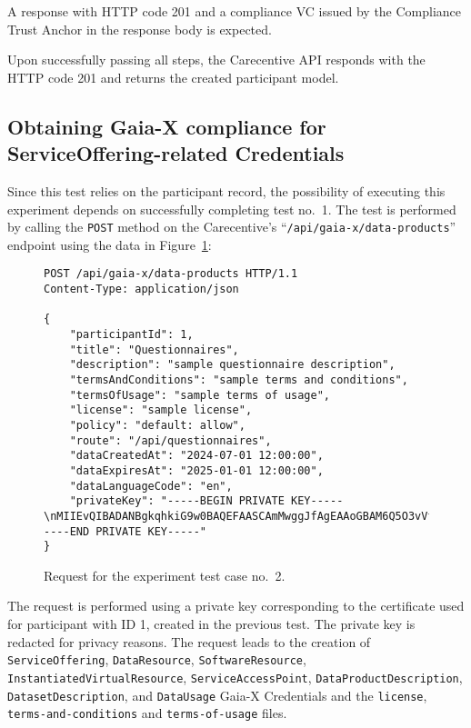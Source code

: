 A response with HTTP code 201 and a compliance VC issued by the Compliance Trust Anchor in the response body is expected.

Upon successfully passing all steps, the Carecentive API responds with the HTTP code 201 and returns the created participant model.

\subsection[Service Offering Compliance]{Obtaining Gaia-X compliance for ServiceOffering-related Credentials}\label{subsec:service-offering-compliance}

Since this test relies on the participant record, the possibility of executing this experiment depends on successfully completing test no.~1.
The test is performed by calling the \texttt{POST} method on the Carecentive's ``\texttt{/api\-/gaia-x\-/data-products}'' endpoint using the data in Figure~\ref{fig:test_case_2}:

\begin{figure}[h]
    \centering
    \begin{verbatim}
POST /api/gaia-x/data-products HTTP/1.1
Content-Type: application/json

{
    "participantId": 1,
	"title": "Questionnaires",
	"description": "sample questionnaire description",
	"termsAndConditions": "sample terms and conditions",
	"termsOfUsage": "sample terms of usage",
	"license": "sample license",
	"policy": "default: allow",
	"route": "/api/questionnaires",
	"dataCreatedAt": "2024-07-01 12:00:00",
	"dataExpiresAt": "2025-01-01 12:00:00",
	"dataLanguageCode": "en",
	"privateKey": "-----BEGIN PRIVATE KEY-----\nMIIEvQIBADANBgkqhkiG9w0BAQEFAASCAmMwggJfAgEAAoGBAM6Q5O3vVfnxk6P7\n...\nYWw+HiFJh9XQpRUtv9PV8L8AqFFfMdsOpT6pgC+aA/WB\n-----END PRIVATE KEY-----"
}
    \end{verbatim}
    \caption{Request for the experiment test case no.~2.}\label{fig:test_case_2}
\end{figure}

The request is performed using a private key corresponding to the certificate used for participant with ID 1, created in the previous test.
The private key is redacted for privacy reasons.
The request leads to the creation of \texttt{ServiceOffering}, \texttt{DataResource}, \texttt{SoftwareResource}, \texttt{InstantiatedVirtualResource}, \texttt{ServiceAccessPoint}, \texttt{DataProductDescription}, \texttt{DatasetDescription}, and \texttt{DataUsage} Gaia-X Credentials and the \texttt{license}, \texttt{terms-and-conditions} and \texttt{terms-of-usage} files.

